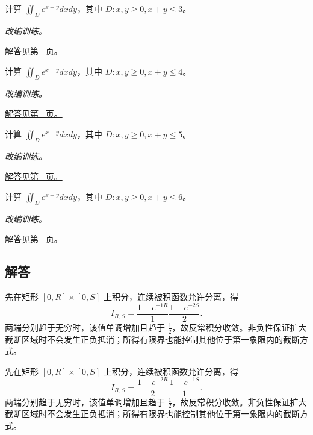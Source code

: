 \documentclass[UTF8,12pt,a4paper,fontset=fandol]{ctexart}
\begin{document}
\begin{example}[三角形上的指数密度]\label{ex:c40q21}
计算 $\displaystyle\iint_D e^{x+y}dxdy$，其中 $D:x,y\ge0,x+y\le 3$。
\par\textit{改编训练。}\par\hyperref[ans:c40q21]{解答见第~\pageref{ans:c40q21} 页。}
\end{example}
\begin{example}[三角形上的指数密度]\label{ex:c40q22}
计算 $\displaystyle\iint_D e^{x+y}dxdy$，其中 $D:x,y\ge0,x+y\le 4$。
\par\textit{改编训练。}\par\hyperref[ans:c40q22]{解答见第~\pageref{ans:c40q22} 页。}
\end{example}
\begin{example}[三角形上的指数密度]\label{ex:c40q23}
计算 $\displaystyle\iint_D e^{x+y}dxdy$，其中 $D:x,y\ge0,x+y\le 5$。
\par\textit{改编训练。}\par\hyperref[ans:c40q23]{解答见第~\pageref{ans:c40q23} 页。}
\end{example}
\begin{example}[三角形上的指数密度]\label{ex:c40q24}
计算 $\displaystyle\iint_D e^{x+y}dxdy$，其中 $D:x,y\ge0,x+y\le 6$。
\par\textit{改编训练。}\par\hyperref[ans:c40q24]{解答见第~\pageref{ans:c40q24} 页。}
\end{example}
\subsection{解答}
\begin{solve}\label{ans:c40q1}
先在矩形 $[0,R]\times[0,S]$ 上积分，连续被积函数允许分离，得
\[
I_{R,S}=\frac{1-e^{-1R}}{1}\frac{1-e^{-2S}}{2}.
\]
两端分别趋于无穷时，该值单调增加且趋于 $\frac{1}{2}$，故反常积分收敛。非负性保证扩大截断区域时不会发生正负抵消；所得有限界也能控制其他位于第一象限内的截断方式。
\end{solve}

\begin{solve}\label{ans:c40q2}
先在矩形 $[0,R]\times[0,S]$ 上积分，连续被积函数允许分离，得
\[
I_{R,S}=\frac{1-e^{-2R}}{2}\frac{1-e^{-1S}}{1}.
\]
两端分别趋于无穷时，该值单调增加且趋于 $\frac{1}{2}$，故反常积分收敛。非负性保证扩大截断区域时不会发生正负抵消；所得有限界也能控制其他位于第一象限内的截断方式。
\end{solve}
\end{document}

